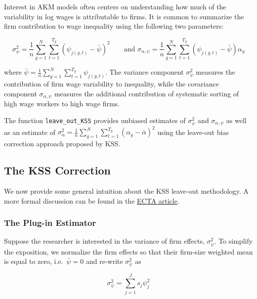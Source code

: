 \documentclass[11pt]{article}
\begin{document}
Interest in AKM models often centers on understanding how much of the
variability in log wages is attributable to firms. It is common to
summarize the firm contribution to wage inequality using the following
two parameters:

\begin{equation}
\sigma_{\psi }^2 =\frac{1}{n}\sum_{g=1}^N \sum_{t=1}^{T_g } {\left(\psi_{j\left(g,t\right)} -\bar{\psi} \right)}^2 \qquad \text{and }\sigma_{\alpha ,\psi } =\frac{1}{n}\sum_{g=1}^N \sum_{t=1}^{T_g } \left(\psi_{j\left(g,t\right)} -\bar{\psi} \right)\alpha_g           
\end{equation}

where
\(\bar{\psi} =\frac{1}{n}\sum_{g=1}^N \sum_{t=1}^{T_g } \psi_{j(g,t)}\).
The variance component \(\sigma_{\psi }^2\) measures the contribution of
firm wage variability to inequality, while the covariance component
\(\sigma_{\alpha ,\psi }\) measures the additional contribution of
systematic sorting of high wage workers to high wage firms.

The function \texttt{leave\_out\_KSS} provides unbiased estimates of
\(\sigma_{\psi }^2\) and \(\sigma_{\alpha ,\psi }\) as well as an
estimate of
\(\sigma_{\alpha }^2 =\frac{1}{n}\sum_{g=1}^N \sum_{t=1}^{T_g } {\left(\alpha_g -\bar{\alpha} \right)}^2\)
using the leave-out bias correction approach proposed by KSS.

\hypertarget{the-kss-correction}{%
\subsection{The KSS Correction}\label{the-kss-correction}}

We now provide some general intuition about the KSS leave-out
methodology. A more formal discussion can be found in the  \href{https://eml.berkeley.edu/~pkline/papers/KSS2020.pdf}{ECTA article}.

\hypertarget{the-plug-in-estimator}{%
\subsubsection{The Plug-in Estimator}\label{the-plug-in-estimator}}

Suppose the researcher is interested in the variance of firm effects,
\(\sigma_{\psi }^2\). To simplify the exposition, we normalize the firm
effects so that their firm-size weighted mean is equal to zero,
i.e.~\(\bar{\psi}=0\) and re-write \(\sigma_{\psi }^2\) as

\begin{equation}
\sigma_{\psi }^2 =\sum_{j=1}^J s_{j}\psi^{2}_{j}
\end{equation}
\end{document}
